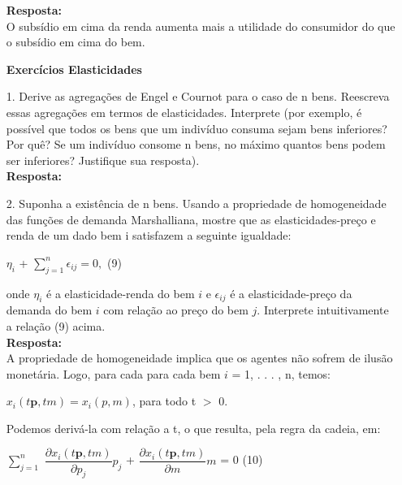 \begin{enumerate}
\textbf{Resposta:}\\
O subsídio em cima da renda aumenta mais a utilidade do consumidor do que o subsídio em cima do bem.

\newpage

\begin{center}
\textbf{Exercícios Elasticidades}\\
\end{center}


\item[1.] Derive as agregações de Engel e Cournot para o caso de n bens. Reescreva essas agregações
em termos de elasticidades. Interprete (por exemplo, é possível que todos os bens que um indivíduo consuma sejam bens inferiores? Por quê? Se um indivíduo consome n bens, no máximo quantos bens podem ser inferiores? Justifique sua resposta).\\

\textbf{Resposta:}\\

\item[2.] Suponha a existência de n bens. Usando a propriedade de homogeneidade das funções de demanda Marshalliana, mostre que as elasticidades-preço e renda de um dado bem i satisfazem a seguinte igualdade:\\

\begin{center}                                                        
{$\eta_{i}$} + {$\displaystyle \sum_{j=1}^{n} \epsilon_{ij} = 0,$}
\hspace{65mm}(9)
\end{center}

onde {$\eta_{i}$} é a elasticidade-renda do bem {$i$} e {$\epsilon_{ij}$} é a elasticidade-preço da demanda do bem {$i$} com relação ao preço do bem {$j$}. Interprete intuitivamente a relação (9) acima.\\

\textbf{Resposta:}\\

A propriedade de homogeneidade implica que os agentes não sofrem de ilusão monetária. Logo, para cada para cada bem {$i$} = 1, . . . , n, temos:
\begin{center}
{$x_{i}(t{\textbf{p}}, t{m}) = x_{i}(p, m)$}, para todo t {$>$} 0.
\end{center}
 
Podemos derivá-la com relação a t, o que resulta, pela regra da cadeia, em:

\begin{center}
{$\displaystyle \sum_{j=1}^{n}$} {$\dfrac{\partial x_{i}(t \textbf{p}, tm)}{\partial p_{j}}$}{$p_{j}$} +
{$\dfrac{\partial x_{i}(t \textbf{p}, tm)}{\partial m}$}{$m$} = 0
\hspace{30mm}(10)
\end{center}


\end{enumerate}
